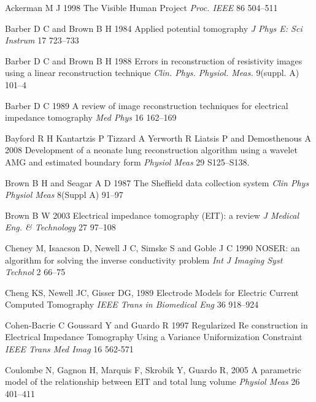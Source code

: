\documentclass[12pt]{iopart}
\begin{document}
\item[]
Ackerman M J  1998  
The Visible Human Project
{\em Proc. IEEE}
86 504--511


%

\item[]
Barber D C and Brown B H 1984
Applied potential tomography
{\em J Phys E: Sci Instrum}
 17 723--733

\item[]
Barber D C and Brown B H 1988 Errors in reconstruction of
resistivity images using a linear reconstruction technique {\em
Clin. Phys. Physiol. Meas.} 
9(suppl. A) 101--4

\item[]
Barber D C 1989
A review of image reconstruction techniques for electrical
 impedance tomography
{\em Med Phys}
16 162--169

\item[]
Bayford R H Kantartzis P Tizzard A Yerworth R Liatsis P and Demosthenous A
 2008
Development of a neonate lung reconstruction algorithm using a wavelet
 AMG and estimated boundary form
{\em  Physiol Meas} 29 S125--S138.


\item[]
Brown B H and Seagar A D 1987 
The Sheffield data collection system
{\em Clin Phys Physiol Meas}
 8(Suppl A) 91--97

\item[]
Brown B W 2003
Electrical impedance tomography (EIT): a review
{\em J Medical Eng. \& Technology}
27 97--108


\item[]
Cheney M, Isaacson D, Newell J C, Simske S and Goble J C 1990
NOSER: an algorithm for solving the inverse conductivity problem
{\em Int J Imaging Syst Technol} 
2 66--75

\item[]
Cheng KS, Newell JC, Gisser DG, 1989
Electrode Models for Electric Current Computed Tomography
{\em IEEE Trans in Biomedical Eng}
36 918--924


\item[]
Cohen-Bacrie C  Goussard Y and Guardo R
1997
Regularized Re construction in Electrical
Impedance Tomography Using a Variance
Uniformization Constraint 
{\em IEEE Trans Med Imag} 16 562-571

\item[]
Coulombe N, Gagnon H, Marquis F, Skrobik Y, Guardo R, 2005
A parametric model of the relationship between EIT and total lung volume
{\em Physiol Meas}
26 401--411
\end{document}
